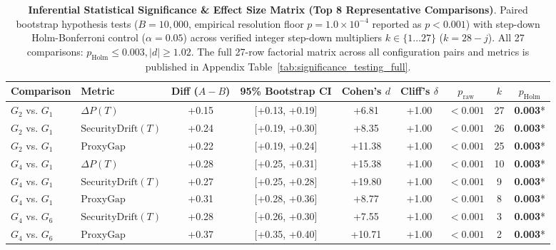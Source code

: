 \begin{table}[t]
\centering
\small
\caption{\textbf{Inferential Statistical Significance & Effect Size Matrix (Top 8 Representative Comparisons)}. Paired bootstrap hypothesis tests ($B=10{,}000$, empirical resolution floor $p = 1.0 \times 10^{-4}$ reported as $p < 0.001$) with step-down Holm-Bonferroni control ($\alpha=0.05$) across verified integer step-down multipliers $k \in \{1 \dots 27\}$ ($k = 28 - j$). All 27 comparisons: $p_{\text{Holm}}\le 0.003, |d|\ge 1.02$. The full 27-row factorial matrix across all configuration pairs and metrics is published in Appendix Table~\ref{tab:significance_testing_full}.}
\label{tab:significance_testing}
\begin{tabular}{llccccccc}
\toprule
\textbf{Comparison} & \textbf{Metric} & \textbf{Diff ($A-B$)} & \textbf{95\% Bootstrap CI} & \textbf{Cohen's $d$} & \textbf{Cliff's $\delta$} & \textbf{$p_{\text{raw}}$} & \textbf{$k$} & \textbf{$p_{\text{Holm}}$} \\
\midrule
$G_2$ vs. $G_1$ & $\Delta P(T)$ & +0.15 & [+0.13, +0.19] & +6.81 & +1.00 & $<0.001$ & 27 & \textbf{0.003}* \\
$G_2$ vs. $G_1$ & $\text{SecurityDrift}(T)$ & +0.24 & [+0.19, +0.30] & +8.35 & +1.00 & $<0.001$ & 26 & \textbf{0.003}* \\
$G_2$ vs. $G_1$ & $\text{ProxyGap}$ & +0.22 & [+0.19, +0.24] & +11.38 & +1.00 & $<0.001$ & 25 & \textbf{0.003}* \\
$G_4$ vs. $G_1$ & $\Delta P(T)$ & +0.28 & [+0.25, +0.31] & +15.38 & +1.00 & $<0.001$ & 10 & \textbf{0.003}* \\
$G_4$ vs. $G_1$ & $\text{SecurityDrift}(T)$ & +0.27 & [+0.25, +0.28] & +19.80 & +1.00 & $<0.001$ & 9 & \textbf{0.003}* \\
$G_4$ vs. $G_1$ & $\text{ProxyGap}$ & +0.31 & [+0.28, +0.36] & +8.77 & +1.00 & $<0.001$ & 8 & \textbf{0.003}* \\
$G_4$ vs. $G_6$ & $\text{SecurityDrift}(T)$ & +0.28 & [+0.26, +0.30] & +7.55 & +1.00 & $<0.001$ & 3 & \textbf{0.003}* \\
$G_4$ vs. $G_6$ & $\text{ProxyGap}$ & +0.37 & [+0.35, +0.40] & +10.71 & +1.00 & $<0.001$ & 2 & \textbf{0.003}* \\
\bottomrule
\end{tabular}
\end{table}
